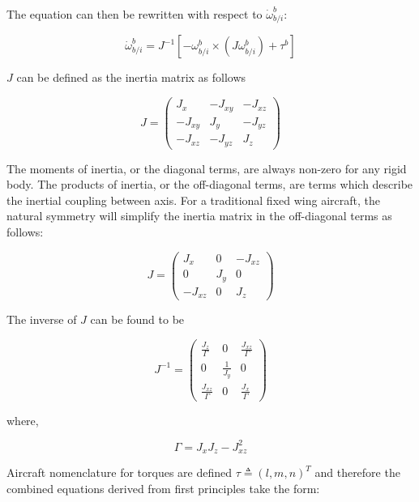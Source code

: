 The equation can then be rewritten with respect to $\dot{\omega}_{b/i}^b$:

\begin{equation}
\dot{\omega}_{b/i}^b=J^{-1}\left[-\omega_{b/i}^b\times\left(J\omega_{b/i}^b\right)+\tau^b\right]
\end{equation}

$J$ can be defined as the inertia matrix as follows

\begin{equation}
J=
 \begin{pmatrix}
 J_x & -J_{xy} & -J_{xz}\\
 -J_{xy} & J_y & -J_{yz}\\
 -J_{xz} & -J_{yz} & J_z
 \end{pmatrix}
\end{equation}

The moments of inertia, or the diagonal terms, are always non-zero for any rigid body.  The products of inertia, or the off-diagonal terms, are terms which describe the inertial coupling between axis.  For a traditional fixed wing aircraft, the natural symmetry will simplify the inertia matrix in the off-diagonal terms as follows:

\begin{equation}
J=
 \begin{pmatrix}
 J_x & 0 & -J_{xz}\\
 0 & J_y & 0\\
 -J_{xz} & 0 & J_z
 \end{pmatrix}
\end{equation}

The inverse of $J$ can be found to be

\begin{equation}
J^{-1}=
 \begin{pmatrix}
 \frac{J_z}{\Gamma} & 0 & \frac{J_{xz}}{\Gamma}\\
 0 & \frac{1}{J_y} & 0\\
 \frac{J_{xz}}{\Gamma} & 0 & \frac{J_x}{\Gamma}
 \end{pmatrix}
\end{equation}

where,

\begin{equation}
\Gamma = J_xJ_z-J_{xz}^2
\end{equation}

Aircraft nomenclature for torques are defined $\tau\triangleq(l,m,n)^T$ and therefore the combined equations derived from first principles take the form:

